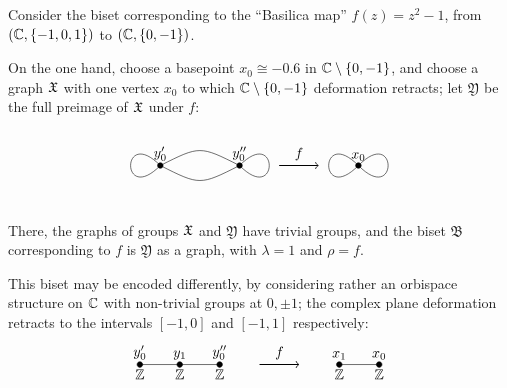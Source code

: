 \documentclass{amsart}
\begin{document}
\begin{exple}\label{exm:Basil}
  Consider the biset corresponding to the ``Basilica map''
  $f(z)=z^2-1$, from $({\mathbb C},\{-1,0,1\})$ to $({\mathbb C},\{0,-1\})$.

  On the one hand, choose a basepoint $x_0\cong-0.6$ in
  ${\mathbb C}\setminus\{0,-1\}$, and choose a graph ${\mathfrak X}$ with one vertex
  $x_0$ to which ${\mathbb C}\setminus\{0,-1\}$ deformation retracts; let
  $\mathfrak Y$ be the full preimage of ${\mathfrak X}$ under $f$:
  \[\begin{tikzpicture}
    \begin{scope}
      \node at (-1,0) [above] {$y_0'$};
      \node at (1,0) [above] {$y_0''$};
      \filldraw (1,0) circle (2pt) (-1,0) circle (2pt);
      \draw (1,0) .. controls +(1,1) and +(1,-1) .. +(0,0);
      \draw (-1,0) .. controls +(-1,1) and +(-1,-1) .. +(0,0);
      \draw (1,0) .. controls (0,0.5) .. (-1,0);
      \draw (1,0) .. controls (0,-0.5) .. (-1,0);
    \end{scope}
    \draw[->,thick] (2,0) -- node[above] {$f$} +(1,0);
    \begin{scope}[xshift=4cm]
      \node at (0,0) [above] {$x_0$};
      \filldraw (0,0) circle (2pt);
      \draw (0,0) .. controls +(1,1) and +(1,-1) .. +(0,0);
      \draw (0,0) .. controls +(-1,1) and +(-1,-1) .. +(0,0);
    \end{scope}
  \end{tikzpicture}\]
  There, the graphs of groups ${\mathfrak X}$ and $\mathfrak Y$ have trivial
  groups, and the biset $\mathfrak B$ corresponding to $f$ is
  $\mathfrak Y$ as a graph, with $\lambda=1$ and $\rho=f$.

  This biset may be encoded differently, by considering rather an
  orbispace structure on ${\mathbb C}$ with non-trivial groups at $0,\pm1$; the
  complex plane deformation retracts to the intervals $[-1,0]$ and
  $[-1,1]$ respectively:
  \[\begin{tikzpicture}
    \begin{scope}
      \node at (-1,0) [above] {$y_0'$};
      \node at (-1,0) [below] {$\Z$};
      \node at (1,0) [above] {$y_0''$};
      \node at (1,0) [below] {$\Z$};
      \node at (0,0) [above] {$y_1$};
      \node at (0,0) [below] {$\Z$};
      \filldraw (-1,0) circle (2pt) -- (0,0) circle (2pt) -- (1,0) circle (2pt);
    \end{scope}
    \draw[->,thick] (2,0) -- node[above] {$f$} +(1,0);
    \begin{scope}[xshift=5cm]
      \node at (0,0) [above] {$x_0$};
      \node at (0,0) [below] {$\Z$};
      \node at (-1,0) [above] {$x_1$};
      \node at (-1,0) [below] {$\Z$};
      \filldraw (0,0) circle (2pt) -- (-1,0) circle (2pt);
    \end{scope}
  \end{tikzpicture}\]


\end{exple}
\end{document}
